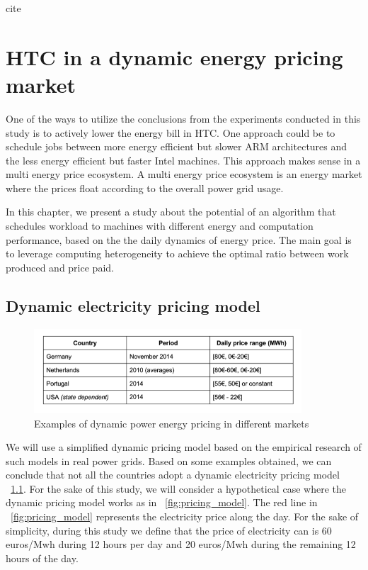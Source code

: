 cite\chapter{HTC in a dynamic energy pricing market}

One of the ways to utilize the conclusions from the experiments conducted in this study is to actively lower the energy bill in HTC. One approach could be to schedule jobs between more energy efficient but slower ARM architectures and the less energy efficient but faster Intel machines. This approach makes sense in a multi energy price ecosystem. A multi energy price ecosystem is an energy market where the prices float according to the overall power grid usage.

In this chapter, we present a study about the potential of an algorithm that schedules workload to machines with different energy and computation performance, based on the the daily dynamics of energy price. The main goal is to leverage computing heterogeneity to achieve the optimal ratio between work produced and price paid.  

\section{Dynamic electricity pricing model}

\begin{figure}[h]
  \centering
    \includegraphics[width=100mm]{"img/pricing_model_table2"}
    \caption{Examples of dynamic power energy pricing in different markets}
    \label{fig:pricing_model_table}
\end{figure}

We will use a simplified dynamic pricing model based on the empirical research of such models in real power grids. Based on some examples obtained, we can conclude that not all the countries adopt a dynamic electricity pricing model ~\ref{fig:pricing_model_table}. For the sake of this study, we will consider a hypothetical case where the dynamic pricing model works as in ~\ref{fig:pricing_model}. The red line in ~\ref{fig:pricing_model} represents the electricity price along the day. For the sake of simplicity, during this study we define that the price of electricity can is  60 euros/Mwh during 12 hours per day and 20 euros/Mwh during the remaining 12 hours of the day.  
	
